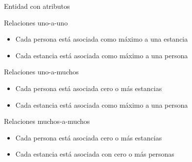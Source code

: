 \documentclass{classes/beamer_GeomaticaUA}
\begin{document}
\begin{frame}{Entidad con atributos}
\begin{center}
\resizebox{\textheight}{!}{%

}
\end{center}
\end{frame}


\begin{frame}{Relaciones uno-a-uno}

\begin{center}

\end{center}

\begin{itemize}
\item Cada persona está asociada como máximo a una estancia
\item Cada estancia está asociada como máximo a una persona
\end{itemize}

\end{frame}


\begin{frame}{Relaciones uno-a-muchos}

\begin{center}

\end{center}
\begin{itemize}
\item Cada persona está asociada cero o más estancias
\item Cada estancia está asociada como máximo a una persona
\end{itemize}

\end{frame}

\begin{frame}{Relaciones muchos-a-muchos}

\begin{center}

\end{center}

\begin{itemize}
\item Cada persona está asociada cero o más estancias
\item Cada estancia está asociada con cero o más personas
\end{itemize}

\end{frame}
\end{document}
